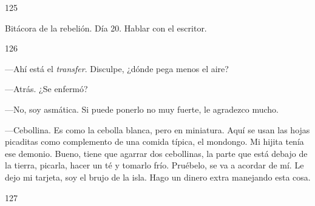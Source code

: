 \documentclass[12pt,twoside,openright,a5paper]{book}
\begin{document}
\vspace{0.5cm}

\hrulefill \hspace{0.1cm}\decofourleft\hspace{0.2cm} 125 \hspace{0.2cm}\decofourright \hspace{0.1cm}\hrulefill

\nopagebreak

\vspace{0.5cm}

\nopagebreak

Bitácora de la rebelión. Día 20. Hablar con el escritor.

\vspace{0.5cm}

\hrulefill \hspace{0.1cm}\decofourleft\hspace{0.2cm} 126 \hspace{0.2cm}\decofourright \hspace{0.1cm}\hrulefill

\nopagebreak

\vspace{0.5cm}

\nopagebreak

---Ahí está el \emph{transfer}. Disculpe, ¿dónde pega menos el aire?

---Atrás. ¿Se enfermó?

---No, soy asmática. Si puede ponerlo no muy fuerte, le agradezco mucho.

---Cebollina. Es como la cebolla blanca, pero en miniatura. Aquí se usan las
hojas picaditas como complemento de una comida típica, el mondongo. Mi
hijita tenía ese demonio. Bueno, tiene que agarrar
dos cebollinas, la parte que está debajo de la tierra, picarla, hacer
un té y tomarlo frío. Pruébelo, se va a acordar de mí. Le dejo mi tarjeta,
soy el brujo de la isla. Hago un dinero extra manejando esta cosa.

\vspace{0.5cm}

\hrulefill \hspace{0.1cm}\decofourleft\hspace{0.2cm} 127 \hspace{0.2cm}\decofourright \hspace{0.1cm}\hrulefill

\nopagebreak

\vspace{0.5cm}
\end{document}
